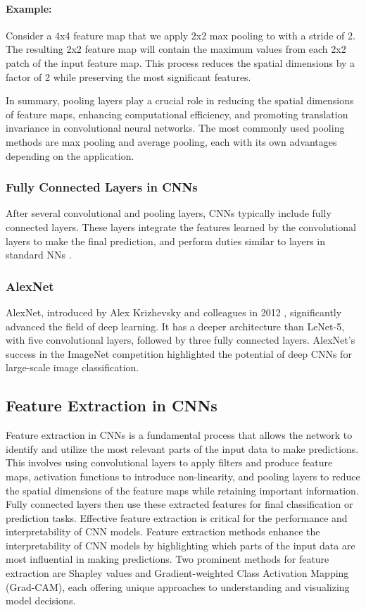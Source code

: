 \documentclass[english,11pt,a4paper,titlepage]{article}
\begin{document}
	\paragraph{Example:}
	Consider a 4x4 feature map that we apply 2x2 max pooling to with a stride of 2. The resulting 2x2 feature map will contain the maximum values from each 2x2 patch of the input feature map. This process reduces the spatial dimensions by a factor of 2 while preserving the most significant features.
	
	In summary, pooling layers play a crucial role in reducing the spatial dimensions of feature maps, enhancing computational efficiency, and promoting translation invariance in convolutional neural networks. The most commonly used pooling methods are max pooling and average pooling, each with its own advantages depending on the application.
	
	\subsubsection*{Fully Connected Layers in CNNs}
	After several convolutional and pooling layers, CNNs typically include fully connected layers. These layers integrate the features learned by the convolutional layers to make the final prediction, and perform duties similar to layers in standard NNs \cite{osheaIntroductionConvolutionalNeural2015}.
	
	\subsubsection*{AlexNet}
	AlexNet, introduced by Alex Krizhevsky and colleagues in 2012 \cite{krizhevskyImageNetClassificationDeep2017}, significantly advanced the field of deep learning. It has a deeper architecture than LeNet-5, with five convolutional layers, followed by three fully connected layers. AlexNet's success in the ImageNet competition highlighted the potential of deep CNNs for large-scale image classification.
	
	\subsection*{Feature Extraction in CNNs}
	Feature extraction in CNNs is a fundamental process that allows the network to identify and utilize the most relevant parts of the input data to make predictions. This involves using convolutional layers to apply filters and produce feature maps, activation functions to introduce non-linearity, and pooling layers to reduce the spatial dimensions of the feature maps while retaining important information. Fully connected layers then use these extracted features for final classification or prediction tasks. Effective feature extraction is critical for the performance and interpretability of CNN models. Feature extraction methods enhance the interpretability of CNN models by highlighting which parts of the input data are most influential in making predictions. Two prominent methods for feature extraction are Shapley values and Gradient-weighted Class Activation Mapping (Grad-CAM), each offering unique approaches to understanding and visualizing model decisions.
	
\end{document}
